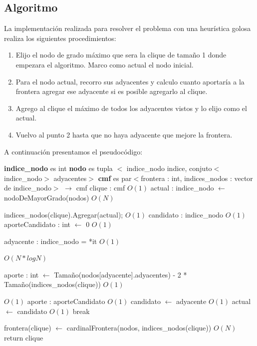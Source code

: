 \documentclass[a4paper, 10pt, twoside]{article}
\newenvironment{pseudo}[1][]{%
    \vspace{1em}%
    \begin{algorithmic}%
}
{%
    \end{algorithmic}%
    \vspace{1em}%
}
\newcommand{\Ode}[1]{\hfill $O(#1)$}
\begin{document}
\subsection{Algoritmo}
La implementación realizada para resolver el problema con una heurística golosa realiza los siguientes procedimientos:
\begin{enumerate}
\item Elijo el nodo de grado máximo que sera la clique de tamaño 1 donde empezara el algoritmo. Marco como actual el nodo inicial.
\item Para el nodo actual, recorro sus adyacentes y calculo cuanto aportaría a la frontera agregar ese adyacente si es posible agregarlo al clique.
\item Agrego al clique el máximo de todos los adyacentes vistos y lo elijo como el actual.
\item Vuelvo al punto 2 hasta que no haya adyacente que mejore la frontera.
\end{enumerate}

A continuación presentamos el pseudocódigo:

\begin{pseudo}
\State \textbf{indice\_nodo} es int
\State \textbf{nodo} es tupla $<$ indice\_nodo indice, conjuto$<$indice\_nodo$>$ adyacentes$>$
\State \textbf{cmf} es par$<$frontera : int, indices\_nodos : vector de indice\_nodo$>$
\State
{} $\rightarrow$ cmf
	\State clique : cmf														\Ode{1}
	\State actual : indice\_nodo $\leftarrow$ nodoDeMayorGrado(nodos)		\Ode{N}

	 	\State indices\_nodos(clique).Agregar(actual);						\Ode{1}
	 	\State candidato : indice\_nodo										\Ode{1}
		\State aporteCandidato : int $\leftarrow$ 0							\Ode{1}


	 		\State adyacente : indice\_nodo = *it							\Ode{1}
	 		
	 					\Ode{N*log N}

	 			\State aporte : int $\leftarrow$ Tamaño(nodos[adyacente].adyacentes) -
	 					     2 * Tamaño(indices\_nodos(clique))				\Ode{1}

	 											\Ode{1}
	 				\State aporte : aporteCandidato							\Ode{1}
	 				\State candidato $\leftarrow$ adyacente					\Ode{1}
	 			\EndIf
	 		\EndIf
	 	\EndFor
	 	 actual $\leftarrow$ candidato			\Ode{1}
	 	\Else
	 		\State break
	 	\EndIf
	\EndWhile

	\State frontera(clique) $\leftarrow$ cardinalFrontera(nodos, indices\_nodos(clique)) \Ode{N}
	\State return clique
\EndProcedure
\end{pseudo}
\end{document}
